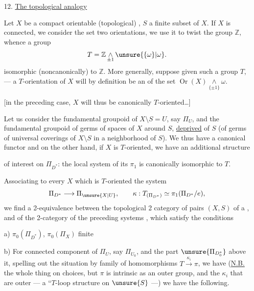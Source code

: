 
12. \uline{The topological analogy}\par\nobreak
Let \(X\) be a compact
orientable (topological) , \(S\) a finite subset of \(X\). If \(X\) is connected, we consider
the set \inserted{\unsure{\(\omega\)}}  two orientations,
we use it to twist the group \(\mathbb Z\), whence a group 
\[
T=\mathbb Z\mathop{\wedge}\limits_{\pm1}\unsure{\{\omega\}|\omega}.
\]
isomorphic (noncanonically) to \(\mathbb Z\). More generally, suppose
given such a group \(T\),
--- a \(T\)-orientation of \(X\) will by definition be an 
of the set \(\operatorname{Or}(X)\mathop{\wedge}\limits_{\{\pm1\}}\omega\).

[in the preceding case, \(X\) will thus be canonically \(T\)-oriented\ldots]

Let us consider the fundamental groupoid of \(X\setminus S=U\), say \(\Pi_U\),
and the fundamental groupoid  of germs
of spaces of \(X\) around \(S\), \uline{deprived} of \(S\)
(of germs of universal coverings of \(X\setminus S\) in a neighborhood of \(S\)).
We thus have a canonical functor
and on the other hand,  if \(X\) is \(T\)-oriented, we have an
additional structure



of interest on  \(\Pi_{D^*}\): the local system of
its \(\pi_1\) is canonically isomorphic to \(T\).

Associating to every \(X\) which is \(T\)-oriented the system
\[
\Pi_{D^*}\longrightarrow\Pi_{\unsure{X|U}},\qquad
\kappa:T_{(\Pi_{D^*})}\simeq\pi_1(\Pi_{D^*}/e),
\]
we find a 2-equivalence between the topological 2 category of
 pairs \((X,S)\) of a
, and of the 2-category of the preceding
systems , \unsure{(}which satisfy the conditions

a) \(\pi_0(\Pi_{D^*})\),  \(\pi_0(\Pi_X)\) finite

b) For  connected component of \(\Pi_U\), say
\(\Pi_{U_0}\), and the part \(\unsure{\Pi_{D_0^*}}\) above it, spelling out the
 situation by 
 family of homomorphisms
\(T\xrightarrow{\kappa_i}\pi\), we have (\uline{N.B.} the whole thing  on choices,
but \(\pi\) is intrinsic as an outer group, and the \(\kappa_i\)
 that are outer ---  a ``\(T\)-loop structure
on \(\unsure{S}\) ---) we have the following.

